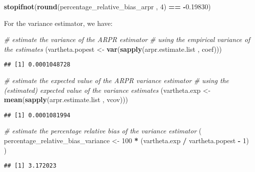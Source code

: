 \documentclass[
]{book}
\newenvironment{Shaded}{\begin{snugshade}}{\end{snugshade}}
\newcommand{\CommentTok}[1]{\textcolor[rgb]{0.56,0.35,0.01}{\textit{#1}}}
\newcommand{\DecValTok}[1]{\textcolor[rgb]{0.00,0.00,0.81}{#1}}
\newcommand{\FloatTok}[1]{\textcolor[rgb]{0.00,0.00,0.81}{#1}}
\newcommand{\FunctionTok}[1]{\textcolor[rgb]{0.13,0.29,0.53}{\textbf{#1}}}
\newcommand{\NormalTok}[1]{#1}
\newcommand{\OtherTok}[1]{\textcolor[rgb]{0.56,0.35,0.01}{#1}}
\newcommand{\SpecialCharTok}[1]{\textcolor[rgb]{0.81,0.36,0.00}{\textbf{#1}}}
\begin{document}
\begin{Shaded}
\begin{Highlighting}[]
\FunctionTok{stopifnot}\NormalTok{(}\FunctionTok{round}\NormalTok{(percentage\_relative\_bias\_arpr , }\DecValTok{4}\NormalTok{) }\SpecialCharTok{==} \SpecialCharTok{{-}}\FloatTok{0.19830}\NormalTok{)}
\end{Highlighting}
\end{Shaded}

For the variance estimator, we have:

\begin{Shaded}
\begin{Highlighting}[]
\CommentTok{\# estimate the variance of the ARPR estimator}
\CommentTok{\# using the empirical variance of the estimates}
\NormalTok{(vartheta.popest }\OtherTok{\textless{}{-}} \FunctionTok{var}\NormalTok{(}\FunctionTok{sapply}\NormalTok{(arpr.estimate.list , coef)))}
\end{Highlighting}
\end{Shaded}

\begin{verbatim}
## [1] 0.0001048728
\end{verbatim}

\begin{Shaded}
\begin{Highlighting}[]
\CommentTok{\# estimate the expected value of the ARPR variance estimator}
\CommentTok{\# using the (estimated) expected value of the variance estimates}
\NormalTok{(vartheta.exp }\OtherTok{\textless{}{-}} \FunctionTok{mean}\NormalTok{(}\FunctionTok{sapply}\NormalTok{(arpr.estimate.list , vcov)))}
\end{Highlighting}
\end{Shaded}

\begin{verbatim}
## [1] 0.0001081994
\end{verbatim}

\begin{Shaded}
\begin{Highlighting}[]
\CommentTok{\# estimate the percentage relative bias of the variance estimator}
\NormalTok{( percentage\_relative\_bias\_variance }\OtherTok{\textless{}{-}} \DecValTok{100} \SpecialCharTok{*}\NormalTok{  (vartheta.exp }\SpecialCharTok{/}\NormalTok{ vartheta.popest }\SpecialCharTok{{-}} \DecValTok{1}\NormalTok{) )}
\end{Highlighting}
\end{Shaded}

\begin{verbatim}
## [1] 3.172023
\end{verbatim}
\end{document}
